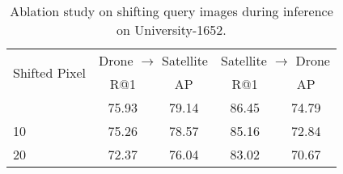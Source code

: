 \documentclass[journal]{IEEEtran}
\begin{document}
\setlength{\tabcolsep}{10pt}
\begin{table}
\small
\caption{Ablation study on shifting query images during inference on University-1652.
}
\begin{center}
\begin{tabular}{l|cc|cc}
\hline
\multirow{2}{*}{Shifted Pixel}& \multicolumn{2}{c|}{Drone $\rightarrow$ Satellite} & \multicolumn{2}{c}{Satellite $\rightarrow$ Drone}\\
  & R@1 & AP & R@1 & AP\\
\shline
0 & 75.93 & 79.14 & 86.45 & 74.79 \\
10 & 75.26 & 78.57 & 85.16 & 72.84 \\
20 & 72.37 & 76.04 & 83.02 & 70.67 \\
\hline
\end{tabular}
\end{center}
\label{table:shift}
\end{table}
\end{document}
